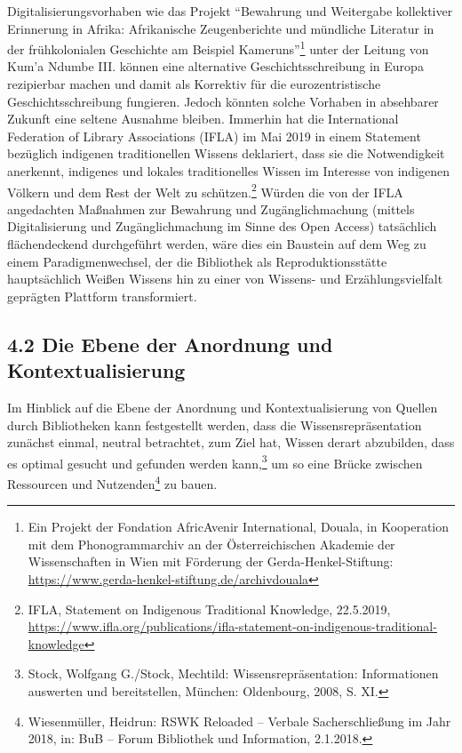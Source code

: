 \documentclass[a4paper,
fontsize=11pt,
oneside,
numbers=noperiodatend,
parskip=half-,
bibliography=totoc,
final
]{scrartcl}
\begin{document}
Digitalisierungsvorhaben wie das Projekt \enquote{Bewahrung und
Weitergabe kollektiver Erinnerung in Afrika: Afrikanische Zeugenberichte
und mündliche Literatur in der frühkolonialen Geschichte am Beispiel
Kameruns}\footnote{Ein Projekt der Fondation AfricAvenir International,
  Douala, in Kooperation mit dem Phonogrammarchiv an der
  Österreichischen Akademie der Wissenschaften in Wien mit Förderung der
  Gerda-Henkel-Stiftung:
  \url{https://www.gerda-henkel-stiftung.de/archivdouala}} unter der
Leitung von Kum'a Ndumbe III. können eine alternative
Geschichtsschreibung in Europa rezipierbar machen und damit als
Korrektiv für die eurozentristische Geschichtsschreibung fungieren.
Jedoch könnten solche Vorhaben in absehbarer Zukunft eine seltene
Ausnahme bleiben. Immerhin hat die International Federation of Library
Associations (IFLA) im Mai 2019 in einem Statement bezüglich indigenen
traditionellen Wissens deklariert, dass sie die Notwendigkeit anerkennt,
indigenes und lokales traditionelles Wissen im Interesse von indigenen
Völkern und dem Rest der Welt zu schützen.\footnote{IFLA, Statement on
  Indigenous Traditional Knowledge, 22.5.2019,
  \url{https://www.ifla.org/publications/ifla-statement-on-indigenous-traditional-knowledge}}
Würden die von der IFLA angedachten Maßnahmen zur Bewahrung und
Zugänglichmachung (mittels Digitalisierung und Zugänglichmachung im
Sinne des Open Access) tatsächlich flächendeckend durchgeführt werden,
wäre dies ein Baustein auf dem Weg zu einem Paradigmenwechsel, der die
Bibliothek als Reproduktionsstätte hauptsächlich Weißen Wissens hin zu
einer von Wissens- und Erzählungsvielfalt geprägten Plattform
transformiert.

\hypertarget{die-ebene-der-anordnung-und-kontextualisierung}{%
\subsection{4.2 Die Ebene der Anordnung und
Kontextualisierung}\label{die-ebene-der-anordnung-und-kontextualisierung}}

Im Hinblick auf die Ebene der Anordnung und Kontextualisierung von
Quellen durch Bibliotheken kann festgestellt werden, dass die
Wissensrepräsentation zunächst einmal, neutral betrachtet, zum Ziel hat,
Wissen derart abzubilden, dass es optimal gesucht und gefunden werden
kann,\footnote{Stock, Wolfgang G./Stock, Mechtild:
  Wissensrepräsentation: Informationen auswerten und bereitstellen,
  München: Oldenbourg, 2008, S. XI.} um so eine Brücke zwischen
Ressourcen und Nutzenden\footnote{Wiesenmüller, Heidrun: RSWK Reloaded
  -- Verbale Sacherschließung im Jahr 2018, in: BuB -- Forum Bibliothek
  und Information, 2.1.2018.} zu bauen.
\end{document}
